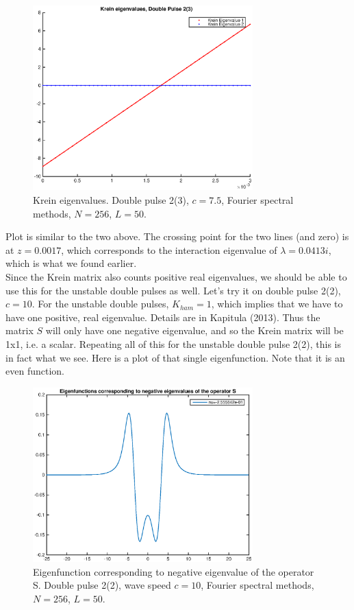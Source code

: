 \documentclass[12pt]{article}
\begin{document}
\begin{figure}[H]
	\includegraphics[width=8.5cm]{dp2_75kreineig1}
	\caption{Krein eigenvalues. Double pulse 2(3), $c = 7.5$, Fourier spectral methods, $N = 256$, $L = 50$. }
\end{figure}

Plot is similar to the two above. The crossing point for the two lines (and zero) is at $z = 0.0017$, which corresponds to the interaction eigenvalue of $\lambda = 0.0413i$, which is what we found earlier.\\

Since the Krein matrix also counts positive real eigenvalues, we should be able to use this for the unstable double pulses as well. Let's try it on double pulse 2(2), $c = 10$. For the unstable double pulses, $K_{ham} = 1$, which implies that we have to have one positive, real eigenvalue. Details are in Kapitula (2013). Thus the matrix $S$ will only have one negative eigenvalue, and so the Krein matrix will be 1x1, i.e. a scalar. Repeating all of this for the unstable double pulse 2(2), this is in fact what we see. Here is a plot of that single eigenfunction. Note that it is an even function.

\begin{figure}[H]
	\includegraphics[width=8.5cm]{dp1vNeg}
	\caption{Eigenfunction corresponding to negative eigenvalue of the operator S. Double pulse 2(2), wave speed $c = 10$, Fourier spectral methods, $N = 256$, $L = 50$.}
\end{figure}
\end{document}
